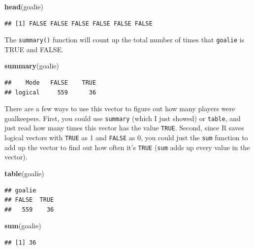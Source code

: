 \documentclass[]{book}
\makeatletter
\newenvironment{Shaded}{\begin{snugshade}}{\end{snugshade}}
\newcommand{\KeywordTok}[1]{\textcolor[rgb]{0.13,0.29,0.53}{\textbf{#1}}}
\newcommand{\NormalTok}[1]{#1}
\newenvironment{kframe}{%
\medskip{}
\setlength{\fboxsep}{.8em}
 \def\at@end@of@kframe{}%
 \ifinner\ifhmode%
  \def\at@end@of@kframe{\end{minipage}}%
  \begin{minipage}{\columnwidth}%
 \fi\fi%
 \def\FrameCommand##1{\hskip\@totalleftmargin \hskip-\fboxsep
 \colorbox{shadecolor}{##1}\hskip-\fboxsep
     \hskip-\linewidth \hskip-\@totalleftmargin \hskip\columnwidth}%
 \MakeFramed {\advance\hsize-\width
   \@totalleftmargin\z@ \linewidth\hsize
   \@setminipage}}%
 {\par\unskip\endMakeFramed%
 \at@end@of@kframe}
\renewenvironment{Shaded}{\begin{kframe}}{\end{kframe}}
\theoremstyle{definition}
\theoremstyle{definition}
\theoremstyle{definition}
\theoremstyle{remark}
\makeatother
\begin{document}
\begin{Shaded}
\begin{Highlighting}[]
\KeywordTok{head}\NormalTok{(goalie)}
\end{Highlighting}
\end{Shaded}

\begin{verbatim}
## [1] FALSE FALSE FALSE FALSE FALSE FALSE
\end{verbatim}

The \texttt{summary()} function will count up the total number of times
that \texttt{goalie} is TRUE and FALSE.

\begin{Shaded}
\begin{Highlighting}[]
\KeywordTok{summary}\NormalTok{(goalie)}
\end{Highlighting}
\end{Shaded}

\begin{verbatim}
##    Mode   FALSE    TRUE 
## logical     559      36
\end{verbatim}

There are a few ways to use this vector to figure out how many players
were goalkeepers. First, you could use \texttt{summary} (which I just
showed) or \texttt{table}, and just read how many times this vector has
the value \texttt{TRUE}. Second, since R saves logical vectors with
\texttt{TRUE} as 1 and \texttt{FALSE} as 0, you could just the
\texttt{sum} function to add up the vector to find out how often it's
\texttt{TRUE} (\texttt{sum} adds up every value in the vector).

\begin{Shaded}
\begin{Highlighting}[]
\KeywordTok{table}\NormalTok{(goalie)}
\end{Highlighting}
\end{Shaded}

\begin{verbatim}
## goalie
## FALSE  TRUE 
##   559    36
\end{verbatim}

\begin{Shaded}
\begin{Highlighting}[]
\KeywordTok{sum}\NormalTok{(goalie)}
\end{Highlighting}
\end{Shaded}

\begin{verbatim}
## [1] 36
\end{verbatim}
\end{document}
